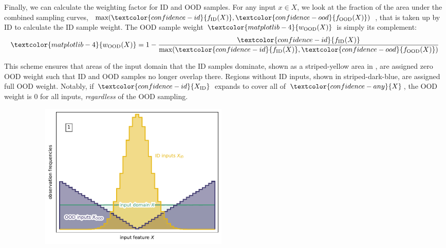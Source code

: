 \begin{multicols}{2}
    Finally, we can calculate the weighting factor for \textcolor{confidence-id}{ID} and \textcolor{confidence-ood}{OOD} samples. For any input \textcolor{confidence-any}{$x \in X$}, we look at the fraction of the area under the combined sampling curves, $\text{max}(\textcolor{confidence-id}{f_{\text{ID}}(X)}, \textcolor{confidence-ood}{f_{\text{OOD}}(X)})$, that is taken up by \textcolor{confidence-id}{ID} to calculate the ID sample weight. The OOD sample weight $\textcolor{matplotlib-4}{w_{\text{OOD}}(X)}$ is simply its complement:
    \begin{equation} \label{eq:ood-weight}
        \textcolor{matplotlib-4}{w_{\text{OOD}}(X)} = 1 - \frac{\textcolor{confidence-id}{f_{\text{ID}}(X)}}{\max(\textcolor{confidence-id}{f_{\text{ID}}(X)}, \textcolor{confidence-ood}{f_{\text{OOD}}(X)})}
    \end{equation}

    \noindent This scheme ensures that areas of the \textcolor{confidence-any}{input domain} that the \textcolor{confidence-id}{ID samples} dominate, shown as a \textcolor{confidence-id}{striped-yellow} area in , are assigned zero \textcolor{matplotlib-4}{OOD weight} such that \textcolor{confidence-id}{ID} and \textcolor{confidence-ood}{OOD} samples no longer overlap there. Regions without ID inputs, shown in \textcolor{confidence-ood}{striped-dark-blue}, are assigned full \textcolor{matplotlib-4}{OOD weight}. Notably, if $\textcolor{confidence-id}{X_{\text{ID}}}$ expands to cover all of $\textcolor{confidence-any}{X}$, the \textcolor{matplotlib-4}{OOD weight} is $0$ for all inputs, \textit{regardless} of the \textcolor{confidence-ood}{OOD sampling}.

    \begin{figure}[H]
        \centering
        \begin{subfigure}
            \centering
            \includegraphics[width=0.49\textwidth]{ood-detection/figures/weighting/id-ood-weights-1.pdf}
        \end{subfigure}


\end{figure}
\end{multicols}
